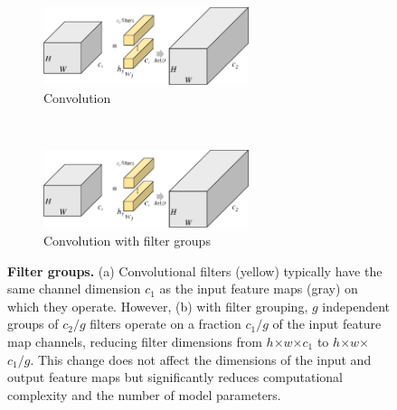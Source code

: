 \documentclass[thesis]{subfiles}
\begin{document}
	\begin{figure}[tbp]
		\begin{subfigure}[b]{0.95\textwidth}
			\centering
			\includegraphics[width=0.66\textwidth, page=1]{Figs/PDF/groupfig}
			\caption{Convolution}\label{fig:normalconv}
		\end{subfigure}
		~
		\begin{subfigure}[b]{0.95\textwidth}
			\centering
			\includegraphics[width=0.66\textwidth, page=2]{Figs/PDF/groupfig}
			\caption{Convolution with filter groups}\label{fig:groupedconv}
		\end{subfigure}
		\caption[Convolutional filter groups.]{\textbf{Filter groups.} (a) Convolutional filters (yellow) typically have the same channel dimension $c_1$ as the input feature maps (gray) on which they operate. However, (b) with filter grouping, $g$ independent groups of $c_2/g$ filters operate on a fraction $c_1/g$ of the input feature map channels, reducing filter dimensions from $h$$\times$$w$$\times$$c_1$ to $h$$\times$$w$$\times$$c_1/g$. This change does not affect the dimensions of the input and output feature maps but significantly reduces computational complexity and the number of model parameters.}\label{fig:groupconfig}
	\end{figure}
\end{document}
